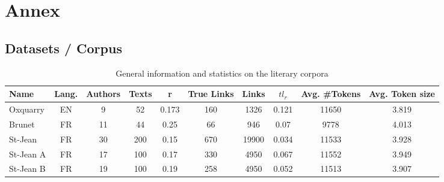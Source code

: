 \section{Annex \label{sec:annex}}

\subsection{Datasets / Corpus}
\label{sec:annex_dataset_corpus}

\begin{table}[H]
  \centering
  \caption{General information and statistics on the literary corpora}
  \label{tab:lit_corpora}
  \begin{tabular}{ l c c c c c c c c c }
    \toprule
    \textbf{Name} &
    \textbf{Lang.} &
    \textbf{Authors} &
    \textbf{Texts} &
    \textbf{r} &
    \textbf{True Links} &
    \textbf{Links} &
    \textbf{$tl_r$} &
    \textbf{Avg. \#Tokens} &
    \textbf{Avg. Token size} \\
    \midrule
    Oxquarry & EN & 9 & 52 & 0.173 & 160 & 1326 & 0.121 & 11650 & 3.819 \\
    Brunet & FR & 11 & 44 & 0.25 & 66 & 946 & 0.07 & 9778 & 4.013 \\
    St-Jean & FR & 30 & 200 & 0.15 & 670 & 19900 & 0.034 & 11533 & 3.928 \\
    St-Jean A & FR & 17 & 100 & 0.17 & 330 & 4950 & 0.067 & 11552 & 3.949 \\
    St-Jean B & FR & 19 & 100 & 0.19 & 258 & 4950 & 0.052 & 11513 & 3.907 \\
    \bottomrule
  \end{tabular}
\end{table}

